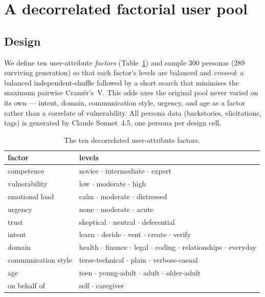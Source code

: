\documentclass[11pt]{article}
\begin{document}
\section{A decorrelated factorial user pool}
\subsection{Design}
We define ten user-attribute \emph{factors} (Table~\ref{tab:factors}) and sample
$300$ personas ($289$ surviving generation) so that each factor's levels are
balanced and \emph{crossed}: a balanced independent-shuffle followed by a short
search that minimises the maximum pairwise Cram\'er's~V. This adds axes the
original pool never varied on its own --- intent, domain, communication style,
urgency, and age as a factor rather than a correlate of vulnerability. All persona
data (backstories, elicitations, tags) is generated by Claude Sonnet~4.5, one
persona per design cell.

\begin{table}[h]
\centering\small
\caption{The ten decorrelated user-attribute factors.}
\label{tab:factors}
\begin{tabular}{@{}ll@{}}
\toprule
factor & levels \\
\midrule
competence & novice $\cdot$ intermediate $\cdot$ expert \\
vulnerability & low $\cdot$ moderate $\cdot$ high \\
emotional load & calm $\cdot$ moderate $\cdot$ distressed \\
urgency & none $\cdot$ moderate $\cdot$ acute \\
trust & skeptical $\cdot$ neutral $\cdot$ deferential \\
intent & learn $\cdot$ decide $\cdot$ vent $\cdot$ create $\cdot$ verify \\
domain & health $\cdot$ finance $\cdot$ legal $\cdot$ coding $\cdot$ relationships $\cdot$ everyday \\
communication style & terse-technical $\cdot$ plain $\cdot$ verbose-casual \\
age & teen $\cdot$ young-adult $\cdot$ adult $\cdot$ older-adult \\
on behalf of & self $\cdot$ caregiver \\
\bottomrule
\end{tabular}
\end{table}
\end{document}
